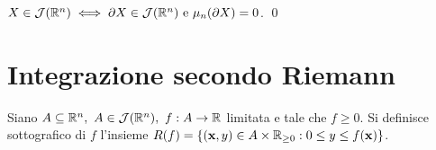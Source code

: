 \begin{lemma}
    $X \in \mathcal{J}(\mathbb{R}^n) \iff \partial X \in \mathcal{J}(\mathbb{R}^n) \text{ e } \mu_n(\partial X)=0$.
    \qed
\end{lemma}

\section{Integrazione secondo Riemann}

\begin{definition}
    Siano $A \subseteq \mathbb{R}^n, \ A \in \mathcal{J}(\mathbb{R}^n), \ f: A \to \mathbb{R}$ limitata e tale che $f \geq 0$. Si definisce sottografico di $f$ l'insieme $R(f)=\{(\vb{x}, y)\in A \times \mathbb{R}_{\geq 0} : 0 \leq y \leq f(\vb{x})\}$.
\end{definition}